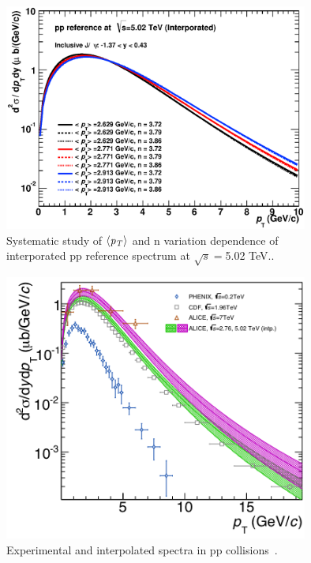 \begin{figure}[!h]
  \centering
  \includegraphics[width=10cm]{chap4/figure/ppref/ppref5TeV_uncorrsys.eps}
  \caption{Systematic study of $\langle \it{p}_{T}\rangle$ and n variation dependence of interporated pp reference spectrum at $\sqrt{s}=$5.02 TeV.. }
  \label{fig_4_ppref}
\end{figure}

\begin{figure}[!h]
  \centering
  \includegraphics[width=10cm]{chap4/figure/ppref/ppspectra.png}
  \caption{Experimental and interpolated spectra in pp collisions~\cite{bib_jpsippref}.}
  \label{fig_4_ppref}
\end{figure}


